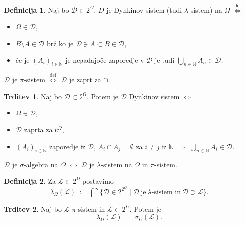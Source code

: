 \documentclass[11pt]{article}
\newcommand{\N}{\mathbb{N}}
\newcommand{\D}{\mathcal{D}}
\renewcommand{\L}{\mathcal{L}}
\renewcommand{\c}{\mathsf{c}}
\newcommand{\diff}{\overset{\text{def}}{\iff}}
\newcommand{\set}[1]{\{#1\}}
\newcommand{\1}{\mathbbm{1}}
\theoremstyle{definition}
\newtheorem{definicija}{Definicija}[section]
\theoremstyle{definition}
\newtheorem{trditev}{Trditev}[section]
\theoremstyle{definition}
\theoremstyle{definition}
\begin{document}
\begin{definicija}

Naj bo $\D \subset 2^\Omega$. $D$ je Dynkinov sistem (tudi $\lambda$-sistem) na $\Omega$ $\diff$
\begin{itemize}
	\item $\Omega \in \D$,
	\item $B\setminus A \in \D $ brž ko je $ \D \ni A \subset B \in \D$,
	\item če je $(A_i)_{i \in \N}$ je nepadajoče zaporedje v $\D$ je tudi $\bigcup_{n \in \N} A_n \in \D$.
\end{itemize}
$\D$ je $\pi$-sistem $\diff$ $\D$ je zaprt za $\cap$.

\end{definicija}
\vspace{0.5cm}

\begin{trditev}

Naj bo $\D \subset 2^\Omega$. Potem je $\D$ Dynkinov sistem $\iff$
\begin{itemize}
	\item $\Omega \in \D$,
	\item $\D$ zaprta za $\c^\Omega$,
	\item $(A_i)_{i \in \N}$ zaporedje iz $\D$, $A_i \cap A_j = \emptyset$ za $i \neq j$ iz $\N$ $\Longrightarrow$ $\bigcup_{n \in \N} A_i \in \D$.
\end{itemize}
$\D$ je $\sigma$-algebra na $\Omega$ $\iff$ $\D$ je $\lambda$-sistem na $\Omega$ in $\pi$-sistem.

\end{trditev}
\vspace{0.5cm}

\begin{definicija}

Za $\L \subset 2^\Omega$ postavimo
$$\lambda_\Omega(\L) ~:=~ \bigcap\set{\D \in 2^{2^\Omega} \mid \D ~\text{je}~\lambda\text{-sistem in}~\D\supset\L}.$$

\end{definicija}
\vspace{0.5cm}

\begin{trditev}

Naj bo $\L$ $\pi$-sistem in $\L \subset 2^\Omega$. Potem je
$$\lambda_\Omega(\L) ~=~ \sigma_\Omega(\L).$$

\end{trditev}
\vspace{0.5cm}
\end{document}
